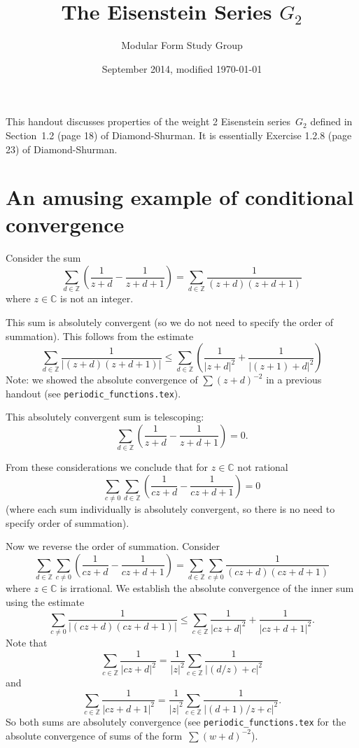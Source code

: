 \documentclass {amsart}
\theoremstyle{plain}
\theoremstyle{definition}
\theoremstyle{remark}
\newcommand{\bZ}{{\mathbb{Z}}}
\newcommand{\bC}{{\mathbb{C}}}
\begin{document}
 

\title{The Eisenstein Series $G_2$}

\author{Modular Form Study Group}

\date{September 2014, modified \today}

\maketitle


This handout discusses properties of the weight 2 Eisenstein series~$G_2$
defined in Section~1.2 (page 18) of Diamond-Shurman. It is essentially Exercise 1.2.8 (page 23)
of Diamond-Shurman.


\section{An amusing example of conditional convergence}

Consider the sum
$$
\sum_{d\in \bZ} 
\left( \frac{1}{z + d} - \frac{1}{z + d+ 1} \right) = \sum_{d\in \bZ} \frac{1}{(z+d)(z + d + 1)}
$$
where $z \in \bC$ is not an integer.

This sum is absolutely convergent (so we do not need to specify the order of summation).
This follows from the estimate
$$
\sum_{\textit{$d \in \bZ$}} \frac{1}{|( z + d)( z + d + 1)|} \le 
\sum_{\textit{$d \in \bZ$}} \left( \frac{1}{|z + d|^2} +  \frac{1}{|(z + 1) + d|^2}  \right)
$$
Note: we showed the absolute convergence of $\sum (z + d)^{-2}$ in a previous
handout (see \texttt{periodic\_functions.tex}).

This absolutely convergent sum is telescoping:
$$
\sum_{d\in \bZ} 
\left( \frac{1}{z + d} - \frac{1}{z + d+ 1} \right) = 0.
$$

From these considerations we conclude that for $z \in\bC$ not rational
$$
\sum_{c \ne 0} \sum_{d\in\bZ} \left( \frac{1}{c z + d} - \frac{1}{c z + d + 1} \right)
=
0
$$
(where each sum individually is absolutely convergent, so there is no need
to specify order of summation).

Now we reverse the order of summation.  Consider
$$
\sum_{d\in\bZ} \sum_{c \ne 0}  \left( \frac{1}{c z + d} - \frac{1}{c z + d + 1} \right)
=
\sum_{d\in\bZ} \sum_{c \ne 0}  \frac{1}{(c z + d)(c z + d + 1)} 
$$
where $z\in \bC$ is irrational.
We establish the absolute convergence of the inner sum
using the estimate
$$
 \sum_{c \ne 0}  \frac{1}{|(c z + d)(c z + d + 1)|} 
 \le
 \sum_{c \in\bZ}  \frac{1}{|c z+d |^2} +  \frac{1}{|c z + d + 1|^2}.
$$
Note that
$$
 \sum_{c \in\bZ}  \frac{1}{|c z+d |^2} = \frac{1}{|z|^2}
  \sum_{c \in\bZ}  \frac{1}{|(d/z) + c |^2} 
$$
and
$$
 \sum_{c \in\bZ}  \frac{1}{|c z+d + 1 |^2} = \frac{1}{|z|^2}
  \sum_{c \in\bZ}  \frac{1}{|(d + 1)/z + c |^2}.
$$
So both sums are absolutely convergence  (see 
\texttt{periodic\_functions.tex} for the absolute convergence
of sums of the form~$\sum (w + d)^{-2}$).
\end{document}

